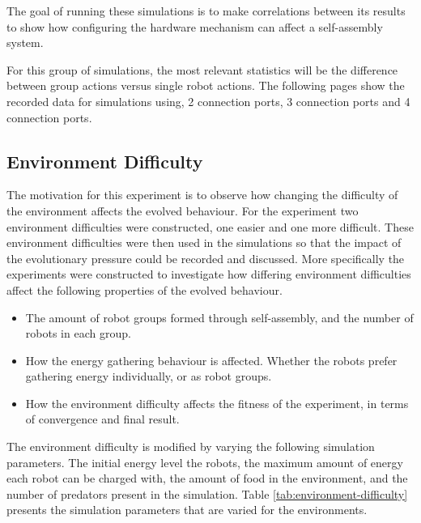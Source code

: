 The goal of running these simulations is to make correlations between its results to show how configuring the hardware mechanism can affect a self-assembly system.
 
For this group of simulations, the most relevant statistics will be the difference between group actions versus single robot actions.
The following pages show the recorded data for simulations using, 2 connection ports, 3 connection ports and 4 connection ports.



\newpage
\pagestyle{plain}



\newpage



\newpage



\newpage
\pagestyle{main}

\subsection{Environment Difficulty}
The motivation for this experiment is to observe how changing the difficulty of the environment affects the evolved behaviour.
For the experiment two environment difficulties were constructed, one easier and one more difficult.
These environment difficulties were then used in the simulations so that the impact of the evolutionary pressure could be recorded and discussed.
More specifically the experiments were constructed to investigate how differing environment difficulties affect the following properties of the evolved behaviour.

\begin{itemize}
	\item The amount of robot groups formed through self-assembly, and the number of robots in each group.
	\item How the energy gathering behaviour is affected. Whether the robots prefer gathering energy individually, or as robot groups. 
	\item How the environment difficulty affects the fitness of the experiment, in terms of convergence and final result.
\end{itemize}


The environment difficulty is modified by varying the following simulation parameters.
The initial energy level the robots, the maximum amount of energy each robot can be charged with, the amount of food in the environment, and the number of predators present in the simulation.
Table \ref{tab:environment-difficulty} presents the simulation parameters that are varied for the environments.

